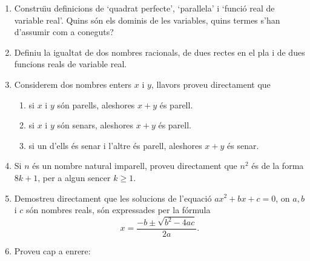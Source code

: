 \begin{enumerate}
\begin{enumerate}
\item Tots els peixos amb moltes espines no s\'{o}n agradables de menjar. Tots
els peixos amb moltes espines s\'{o}n peixos blancs. Per tant, tots els peixos
que siguin agradables de menjar s\'{o}n peixos blancs.

\item Tots els estudiants d'un institut de secund\`{a}ria que assisteixen a
classes d'ampliaci\'{o} s\'{o}n genials. Hi ha un estudiant de l'institut que
\'{e}s intel\textperiodcentered ligent i no \'{e}s genial. Per tant, hi ha un
estudiant de l'institut que \'{e}s intel\textperiodcentered ligent i no
assisteix a classes d'ampliaci\'{o}.
\end{enumerate}

\item Constru\"{\i}u definicions de `quadrat perfecte',
`paral\textperiodcentered lela' i `funci\'{o} real de variable real'. Quins
s\'{o}n els dominis de les variables, quins termes s'han d'assumir com a coneguts?

\item Definiu la igualtat de dos nombres racionals, de dues rectes en el pla i
de dues funcions reals de variable real.

\item Considerem dos nombres enters $x$ i $y$, llavors proveu directament que

\begin{enumerate}
\item si $x$ i $y$ s\'{o}n parells, aleshores $x+y$ \'{e}s parell.

\item si $x$ i $y$ s\'{o}n senars, aleshores $x+y$ \'{e}s parell.

\item si un d'ells \'{e}s senar i l'altre \'{e}s parell, aleshores $x+y$
\'{e}s senar.
\end{enumerate}

\item Si $n$ \'{e}s un nombre natural imparell, proveu directament que $n^{2}
$ \'{e}s de la forma $8k+1$, per a algun sencer $k\geq1$.

\item Demostreu directament que les solucions de l'equaci\'{o} $ax^{2}+bx+c=0
$, on $a,b$ i $c$ s\'{o}n nombres reals, s\'{o}n expressades per la
f\'{o}rmula
\[
x=\frac{-b\pm\sqrt{b^{2}-4ac}}{2a}.
\]


\item Proveu cap a enrere:


\end{enumerate}
